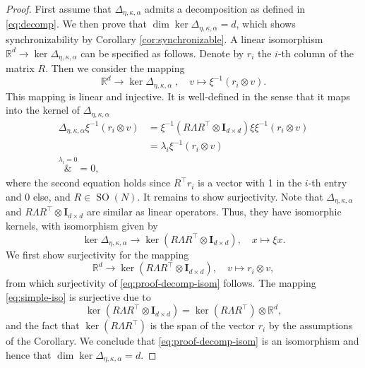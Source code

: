 \documentclass[10pt,reqno]{amsart}
\numberwithin{equation}{section}
\theoremstyle{bfnote}
\theoremstyle{bfdef}
\newcommand{\R}{\mathbb{R}}
\newcommand{\II}{\mathbf{I}_{d \times d}}
\renewcommand\o\operatorname
\begin{document}
		\begin{proof}
			First assume that $\Delta_{\eta,\kappa,\alpha}$ admits a decomposition as defined in \eqref{eq:decomp}. We then prove that $\dim \ker \Delta_{\eta,\kappa,\alpha} = d$, which shows synchronizability by Corollary \ref{cor:synchronizable}.
			A linear isomorphism $\R^{d} \to \ker \Delta_{\eta,\kappa,\alpha}$ can be specified as follows. Denote by $r_i$ the $i$-th column of the matrix $R$. Then we consider the mapping
			\begin{equation}\label{eq:proof-decomp-isom}
				\R^{d} \to \ker \Delta_{\eta,\kappa,\alpha}\; ,
				\quad
				v \mapsto \xi^{-1}(r_{i} \otimes v).
			\end{equation}
			This mapping is linear and injective. It is well-defined in the sense that it maps into the kernel of $\Delta_{\eta,\kappa,\alpha}$
			\begin{subequations}
			\begin{align}
				\Delta_{\eta,\kappa,\alpha}\xi^{-1}(r_{i}\otimes v)
				&=
				\xi^{-1} (R \Lambda R^{\top} \otimes \II) \xi\xi^{-1}(r_{i}\otimes v) \\
				&=
				\lambda_i \xi^{-1}(r_i \otimes v) \\
				\overset{\lambda_i = 0}&{=} 0,
			\end{align}
			\end{subequations}
			where the second equation holds since $R^{\top} r_i$ is a vector with 1 in the $i$-th entry and 0 else, and $R \in \o{SO}(N)$. It remains to show surjectivity. Note that $\Delta_{\eta,\kappa,\alpha}$ and $R \Lambda R^{\top}\otimes \II$ are similar as linear operators. Thus, they have isomorphic kernels, with isomorphism given by
			\begin{equation}
				\ker \Delta_{\eta,\kappa,\alpha}\to \ker (R \Lambda R^{\top}\otimes \II), \quad
				x \mapsto \xi x.
			\end{equation}
			We first show surjectivity for the mapping
			\begin{equation}\label{eq:simple-iso}
				\R^{d} \to \ker (R \Lambda R^{\top}\otimes \II), \quad
				v \mapsto r_{i} \otimes v,
			\end{equation}
			from which surjectivity of \eqref{eq:proof-decomp-isom} follows. The mapping \eqref{eq:simple-iso} is surjective due to
			\begin{equation}
				\ker(R \Lambda R^{\top} \otimes \II) = \ker (R \Lambda R^{\top} )\otimes \R^{d},
			\end{equation}
			and the fact that $\ker (R \Lambda R^{\top})$ is the span of the vector $r_i$ by the assumptions of the Corollary. We conclude that \eqref{eq:proof-decomp-isom} is an isomorphism and hence that $\dim \ker \Delta_{\eta,\kappa,\alpha} = d$.


\end{proof}
\end{document}
